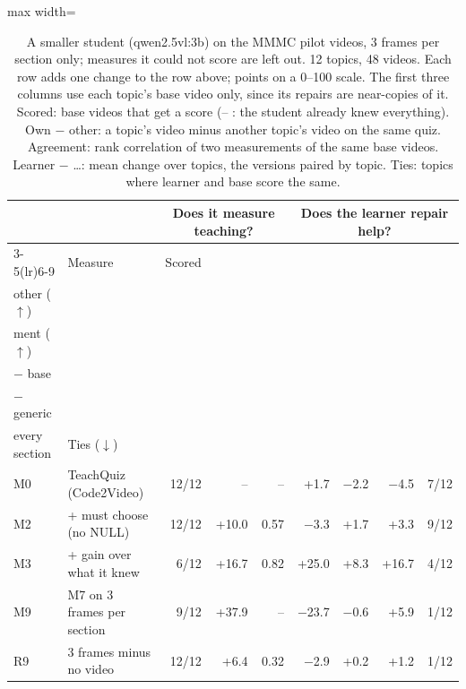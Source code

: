 \begin{table}[!tbp]\centering\footnotesize
\caption{A smaller student (qwen2.5vl:3b) on the MMMC pilot videos, 3 frames per section only; measures it could not score are left out. 12 topics, 48 videos. Each row adds one change to the row above; points on a 0--100 scale. The first three columns use each topic's base video only, since its repairs are near-copies of it. Scored: base videos that get a score (-- : the student already knew everything). Own $-$ other: a topic's video minus another topic's video on the same quiz. Agreement: rank correlation of two measurements of the same base videos. Learner $-$ \ldots: mean change over topics, the versions paired by topic. Ties: topics where learner and base score the same.}\label{tab:ladder_small}
\setlength{\tabcolsep}{4pt}\begin{adjustbox}{max width=\linewidth}\begin{tabular}{@{}llrrrrrrr@{}}\toprule & & \multicolumn{3}{c}{Does it measure teaching?} & \multicolumn{4}{c}{Does the learner repair help?}\\
\cmidrule(lr){3-5}\cmidrule(lr){6-9}
& Measure & Scored & \hd{Own $-$\\other ($\uparrow$)} & \hd{Agree-\\ment ($\uparrow$)} & \hd{Learner\\$-$ base} & \hd{Learner\\$-$ generic} & \hd{Learner $-$\\every section} & Ties ($\downarrow$)\\\midrule
M0 & TeachQuiz (Code2Video) & 12/12 & -- & -- & +1.7 & $-$2.2 & $-$4.5 & 7/12 \\
M2 & + must choose (no NULL) & 12/12 & +10.0 & 0.57 & $-$3.3 & +1.7 & +3.3 & 9/12 \\
M3 & + gain over what it knew & 6/12 & +16.7 & 0.82 & +25.0 & +8.3 & +16.7 & 4/12 \\
M9 & M7 on 3 frames per section & 9/12 & +37.9 & -- & $-$23.7 & $-$0.6 & +5.9 & 1/12 \\
R9 & 3 frames minus no video & 12/12 & +6.4 & 0.32 & $-$2.9 & +0.2 & +1.2 & 1/12 \\
\bottomrule\end{tabular}\end{adjustbox}
\end{table}
